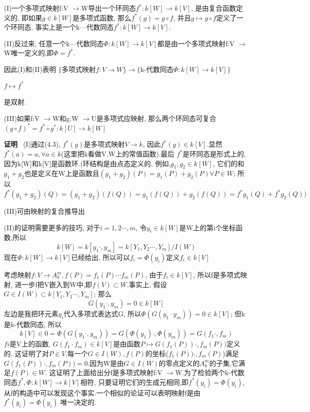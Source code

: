 \documentclass[UTF8]{book}
\begin{document}
		(I)一个多项式映射f:V $\rightarrow $W导出一个环同态$f^{*}:k[W]\rightarrow k[V]$, 是由复合函数定义的, 即如果$g\in k[W]$是多项式函数, 那么$f^{*}(g)=g\circ f$, 并且$g\mapsto g\circ f$定义了一个环同态, 事实上是一个k—代数同态$f^{*}:k[W]\rightarrow k[V]$.

		(II)反过来, 任意一个k—代数同态$\Phi:k[W]\rightarrow k[V]$都是由一个多项式映射f:V $\rightarrow $W唯一定义的,即$\Phi=f^{*}$.

		因此(I)和(II)表明
		\center  $\{$多项式映射$f:V \rightarrow W \}\longrightarrow $$\{$k-代数同态$\Phi:k[W]\rightarrow k[V]\}$



			  $ f \longmapsto f^{*}$

		\justifying


		是双射.

		(III)如果f:V $\rightarrow $W和g:W $\rightarrow $U是多项式应映射, 那么两个环同态可复合$(g\circ f)^{*}=f^{*}\circ g^{*}:k[U]\rightarrow k[W]$

		\textbf{证明} \ (I)通过(4.3), $f^{*}(g)$是多项式映射$V\rightarrow k$, 因此$f^{*}(g)\in k[V]$.显然 $f^{*}(a)=a, \forall a\in k$(这里把k看做V,W上的常值函数).最后 $f^{*}$是环同态是形式上的, 因为k[W]和k[V]是函数环.(环结构是由点态定义的, 例如,$g_{1},g_{2}\in k[W]$, 它们的和 $g_{1}+g_{2}$也是定义在W上是函数且$(g_{1}+g_{2})(P)=g_{1}(P)+g_{2}(P) \forall P\in W$; 所以$f^{*}(g_{1}+g_{2})(Q)=(g_{1}+g_{2})(f(Q))= g_{1}(f(Q))+g_{2}(f(Q))= f^{*}g_{1}(Q)+f^{*}g_{2}(Q))$

		(III)可由映射的复合推导出

		(II)的证明需要更多的技巧, 对于$i=1,2\cdots,m$, 令$y_{i}\in k[W]$是W上的第i个坐标函数,所以
		\begin{equation*}
		k[W]=k[y_{1}  \cdot, y_{m}]=k[Y_{1},Y_{2} \cdots,Y_{m}]/I(W)
		\end{equation*}
		现在$\Phi:k[W]\rightarrow k[V]$已经给出, 所以可以$f_{i}=\Phi(y_{i})$定义$f_{i}\in k[V]$

		考虑映射$f:V \rightarrow A^{m}_{k}, f(P)=f_{1}(P)\cdots f_{m}(P)$, 由于$f_{i}\in k[V]$, 所以f是多项式映射, 进一步f把V嵌入到W中,即$f(V)\subset W$.事实上, 假设$G\in I(W)\subset k[Y_{1},Y_{2}\cdots,Y_{m}]$; 那么
		\begin{equation*}
		G(y_{1}\cdot ,y_{m})=0\in k[W]
		\end{equation*}
		左边是我把环元素$y_{i}$代入多项式表达式G, 所以$\Phi(G(y_{1}\cdot y_{m}))=0\in k[V]$; 但k是k-代数同态, 所以
		\begin{equation*}
		k[V]\in0=\Phi(G(y_{1}\cdot, y_{m}))=G(\Phi(y_{1})\cdot ,\Phi(y_{m}))=G(f_{1}\cdot ,f_{m})
		\end{equation*}
		$f{i}$是V上的函数, $G(f_{1}\cdot f_{m})\in k[V]$是由函数$P\mapsto G(f_{1}(P))\cdot ,f_{m}(P))$定义的. 这证明了对$P\in V$,每一个$G\in I(W),f(P)$的坐标($f_{1}(P))\cdot ,f_{m}(P)$)满足$G(f_{1}(P))\cdot ,f_{m}(P))=0$.因为W是由$G\in I(W)$的零点定义的$A^{m}_{k}$的子集,它满足$f(P)\in W$. 这证明了上面给出分f是多项式映射f:V $\rightarrow $W.为了检验两个k-代数同态$f^{*},\Phi:k[W]\rightarrow k[V]$相符, 只要证明它们的生成元相同,即$f^{*}(y_{i})=\Phi(y_{i})$,从f的构造中可以发现这个事实.一个相似的论证可以表明映射f是由$f^{*}(y_{i})=\Phi(y_{i})$  唯一决定的.
\end{document}
